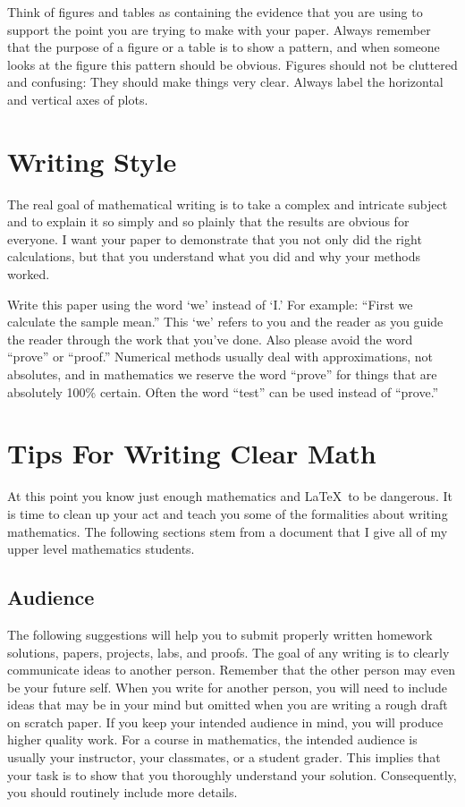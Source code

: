 \documentclass[
]{book}
\theoremstyle{definition}
\theoremstyle{definition}
\theoremstyle{definition}
\theoremstyle{remark}
\begin{document}
Think of figures and tables as containing the evidence that you are
using to support the point you are trying to make with your paper.
Always remember that the purpose of a figure or a table is to show a
pattern, and when someone looks at the figure this pattern should be
obvious. Figures should not be cluttered and confusing: They should make
things very clear. Always label the horizontal and vertical axes of
plots.

\hypertarget{writing-style}{%
\section{Writing Style}\label{writing-style}}

The real goal of mathematical writing is to take a complex and intricate
subject and to explain it so simply and so plainly that the results are
obvious for everyone. I want your paper to demonstrate that you not only
did the right calculations, but that you understand what you did and why
your methods worked.

Write this paper using the word `we' instead of `I.' For example: ``First
we calculate the sample mean.'' This `we' refers to you and the reader as
you guide the reader through the work that you've done. Also please
avoid the word ``prove'' or ``proof.'' Numerical methods usually deal with
approximations, not absolutes, and in mathematics we reserve the word
``prove'' for things that are absolutely 100\% certain. Often the word
``test'' can be used instead of ``prove.''

\hypertarget{tips-for-writing-clear-math}{%
\section{Tips For Writing Clear Math}\label{tips-for-writing-clear-math}}

At this point you know just enough mathematics and LaTeX~to be
dangerous. It is time to clean up your act and teach you some of the
formalities about writing mathematics. The following sections stem from
a document that I give all of my upper level mathematics students.

\hypertarget{audience}{%
\subsection{Audience}\label{audience}}

The following suggestions will help you to submit properly written
homework solutions, papers, projects, labs, and proofs. The goal of any
writing is to clearly communicate ideas to another person. Remember that
the other person may even be your future self. When you write for
another person, you will need to include ideas that may be in your mind
but omitted when you are writing a rough draft on scratch paper. If you
keep your intended audience in mind, you will produce higher quality
work. For a course in mathematics, the intended audience is usually your
instructor, your classmates, or a student grader. This implies that your
task is to show that you thoroughly understand your solution.
Consequently, you should routinely include more details.
\end{document}
